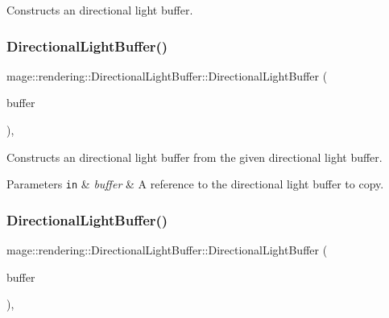 Constructs an directional light buffer. \hypertarget{structmage_1_1rendering_1_1_directional_light_buffer_a8bd677130e2bc44b721935396f3ee9ac}{}\label{structmage_1_1rendering_1_1_directional_light_buffer_a8bd677130e2bc44b721935396f3ee9ac} 
\subsubsection{\texorpdfstring{Directional\+Light\+Buffer()}{DirectionalLightBuffer()}\hspace{0.1cm}{\footnotesize\ttfamily [2/3]}}
{\footnotesize\ttfamily mage\+::rendering\+::\+Directional\+Light\+Buffer\+::\+Directional\+Light\+Buffer (\begin{DoxyParamCaption}\item[{const \hyperlink{structmage_1_1rendering_1_1_directional_light_buffer}{Directional\+Light\+Buffer} \&}]{buffer }\end{DoxyParamCaption})\hspace{0.3cm}{\ttfamily [default]}, {\ttfamily [noexcept]}}

Constructs an directional light buffer from the given directional light buffer.


\begin{DoxyParams}[1]{Parameters}
\mbox{\tt in}  & {\em buffer} & A reference to the directional light buffer to copy. \\
\hline
\end{DoxyParams}
\hypertarget{structmage_1_1rendering_1_1_directional_light_buffer_a2db095d74145a02eb6c6c306501b04e8}{}\label{structmage_1_1rendering_1_1_directional_light_buffer_a2db095d74145a02eb6c6c306501b04e8} 
\subsubsection{\texorpdfstring{Directional\+Light\+Buffer()}{DirectionalLightBuffer()}\hspace{0.1cm}{\footnotesize\ttfamily [3/3]}}
{\footnotesize\ttfamily mage\+::rendering\+::\+Directional\+Light\+Buffer\+::\+Directional\+Light\+Buffer (\begin{DoxyParamCaption}\item[{\hyperlink{structmage_1_1rendering_1_1_directional_light_buffer}{Directional\+Light\+Buffer} \&\&}]{buffer }\end{DoxyParamCaption})\hspace{0.3cm}{\ttfamily [default]}, {\ttfamily [noexcept]}}

